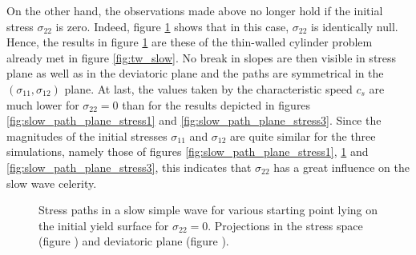 On the other hand, the observations made above no longer hold if the initial stress $\sigma_{22}$ is zero.
Indeed, figure \ref{fig:slow_path_plane_stress2} shows that in this case, $\sigma_{22}$ is identically null.
Hence, the results in figure \ref{fig:slow_path_plane_stress2} are these of the thin-walled cylinder problem already met in figure \ref{fig:tw_slow}.
No break in slopes are then visible in stress plane as well as in the deviatoric plane and the paths are symmetrical in the $(\sigma_{11},\sigma_{12})$ plane.
At last, the values taken by the characteristic speed $c_s$ are much lower for $\sigma_{22}=0$ than for the results depicted in figures \ref{fig:slow_path_plane_stress1} and \ref{fig:slow_path_plane_stress3}.
Since the magnitudes of the initial stresses $\sigma_{11}$ and $\sigma_{12}$ are quite similar for the three simulations, namely those of figures \ref{fig:slow_path_plane_stress1}, \ref{fig:slow_path_plane_stress2} and \ref{fig:slow_path_plane_stress3}, this indicates that $\sigma_{22}$ has a great influence on the slow wave celerity.
\begin{figure}[h!]
  \centering
  \caption{Stress paths in a slow simple wave for various starting point lying on the initial yield surface for $\sigma_{22}=0$. Projections in the stress space (figure ) and deviatoric plane (figure ).}
  \label{fig:slow_path_plane_stress2}
\end{figure}

